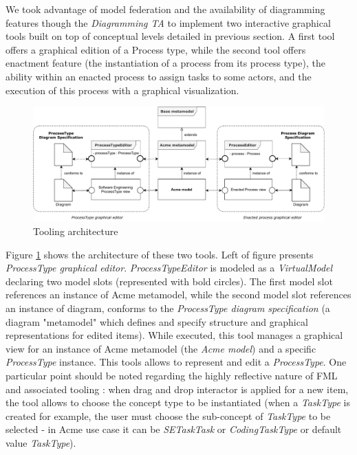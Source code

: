 We took advantage of model federation and the availability of diagramming features though the \textit{Diagramming TA} to implement two interactive graphical tools built on top of conceptual levels detailed in previous section. A first tool offers a graphical edition of a Process type, while the second tool offers enactment feature (the instantiation of a process from its process type), the ability within an enacted process to assign tasks to some actors, and the execution of this process with a graphical visualization.

\begin{figure}
 \centering
     \includegraphics[width=0.9 \textwidth]{Figures/ToolingArchitecture.pdf}
     \caption{Tooling architecture}
    \label{fig:ToolingArchitecture}
\end{figure}

Figure \ref{fig:ToolingArchitecture} shows the architecture of these two tools. Left of figure presents \textit{ProcessType graphical editor}. \textit{ProcessTypeEditor} is modeled as a \textit{VirtualModel} declaring two model slots (represented with bold circles). The first model slot references an instance of Acme metamodel, while the second model slot references an instance of diagram, conforms to the \textit{ProcessType diagram specification} (a diagram "metamodel" which defines and specify structure and graphical representations for edited items). While executed, this tool manages a graphical view for an instance of Acme metamodel (the \textit{Acme model}) and a specific \textit{ProcessType} instance. This tools allows to represent and edit a \textit{ProcessType}. One particular point should be noted regarding the highly reflective nature of FML and associated tooling : when drag and drop interactor is applied for a new item, the tool allows to choose the concept type to be instantiated (when a \textit{TaskType} is created for example, the user must choose the sub-concept of \textit{TaskType} to be selected - in Acme use case it can be \textit{SETaskTask} or \textit{CodingTaskType} or default value \textit{TaskType}). 

